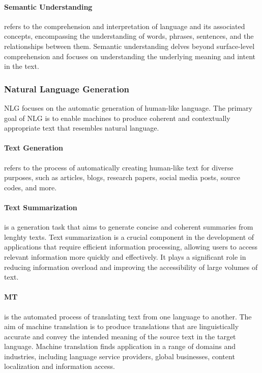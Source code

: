 \paragraph{Semantic Understanding} refers to the comprehension and interpretation of language and its associated concepts, encompassing the understanding of words, phrases, sentences, and the relationships between them. Semantic understanding delves beyond surface-level comprehension and focuses on understanding the underlying meaning and intent in the text.

\subsubsection{Natural Language Generation} 

\ac{NLG} focuses on the automatic generation of human-like language. The primary goal of \ac{NLG} is to enable machines to produce coherent and contextually appropriate text that resembles natural language. 

\paragraph{Text Generation} refers to the process of automatically creating human-like text for diverse purposes, such as articles, blogs, research papers, social media posts, source codes, and more.

\paragraph{Text Summarization} is a generation task that aims to generate concise and coherent summaries from lenghty texts. Text summarization is a crucial component in the development of applications that require efficient information processing, allowing users to access relevant information more quickly and effectively. It plays a significant role in reducing information overload and improving the accessibility of large volumes of text.

\paragraph{\ac{MT}} is the automated process of translating text from one language to another. The aim of machine translation is to produce translations that are linguistically accurate and convey the intended meaning of the source text in the target language. Machine translation finds application in a range of domains and industries, including language service providers, global businesses, content localization and information access. 

